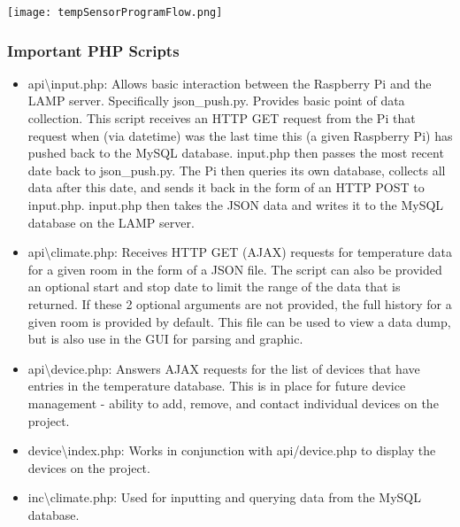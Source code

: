 \documentclass{article}
\begin{document}
			\begin{center}
				\texttt{[image: tempSensorProgramFlow.png]}\\
			\end{center}
					
			\subsubsection{Important PHP Scripts}		
				\begin{itemize}
					\item api\textbackslash input.php: Allows basic interaction between the Raspberry Pi and the LAMP server. Specifically json\_push.py.
														Provides basic point of data collection. This script receives an HTTP GET request from the Pi that 
														request when (via datetime)
														was the last time this (a given Raspberry Pi) has pushed back to the MySQL database. input.php then  
														passes the most recent date back to json\_push.py. The Pi then queries its own database, collects all 
														data after this date, and sends it back in the form of an HTTP POST to input.php. input.php then takes 
														the JSON data and writes it to the MySQL database on the LAMP server.
										  
					\item api\textbackslash climate.php: Receives HTTP GET (AJAX) requests for temperature data for a given room in the form of a JSON file. 
														 The script can also be provided an optional start and stop date to limit the range of the data that 
														 is returned. If these 2 optional arguments are not provided, the full history for a given room is 
														 provided by default. This file can be used to view a data dump, but is also use in the GUI for 
														 parsing and graphic.
					\item api\textbackslash device.php: Answers AJAX requests for the list of devices that have entries in the temperature database. This is
										 in place for future device management - ability to add, remove, and contact individual devices on the project.
					\item device\textbackslash index.php: Works in conjunction with api/device.php to display the devices on the project.	
					
					\item inc\textbackslash climate.php: Used for inputting and querying data from the MySQL database.  	
					

\end{itemize}
\end{document}
